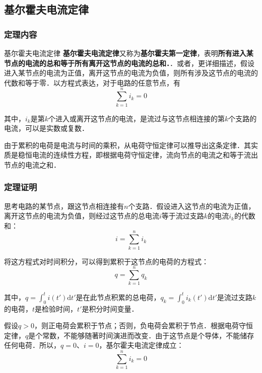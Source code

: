 
\subsection{基尔霍夫电流定律}

\subsubsection{定理内容}
\begin{theorem}{基尔霍夫电流定律}
\textbf{基尔霍夫电流定律}又称为\textbf{基尔霍夫第一定律}，表明\textbf{所有进入某节点的电流的总和等于所有离开这节点的电流的总和．}．或者，更详细描述，假设进入某节点的电流为正值，离开这节点的电流为负值，则所有涉及这节点的电流的代数和等于零．以方程式表达，对于电路的任意节点，有
\begin{equation}
\sum_{k=1}^n i_k =0
\end{equation}

其中，$i_k$是第$k$个进入或离开这节点的电流，是流过与这节点相连接的第$k$个支路的电流，可以是实数或复数．
\end{theorem}


由于累积的电荷是电流与时间的乘积，从电荷守恒定律可以推导出这条定律．其实质是稳恒电流的连续性方程，即根据电荷守恒定律，流向节点的电流之和等于流出节点的电流之和．

\subsubsection{定理证明}
思考电路的某节点，跟这节点相连接有$n$个支路．假设进入这节点的电流为正值，离开这节点的电流为负值，则经过这节点的总电流$i$等于流过支路$k$的电流$i_k$的代数和：
\begin{equation}
i=\sum_{k=1}^n i_k
\end{equation}

将这方程式对时间积分，可以得到累积于这节点的电荷的方程式：
\begin{equation}
q=\sum_{k=1}^n q_k
\end{equation}

其中，$\displaystyle q=\int_0^t i(t') \mathrm{d}t'$是在此节点积累的总电荷，$\displaystyle q_k=\int_0^t i_k(t') \mathrm{d}t'$是流过支路$k$的电荷，$t$是检验时间，$t'$是积分时间变量．

假设$q>0$，则正电荷会累积于节点；否则，负电荷会累积于节点．根据电荷守恒定律，$q$是个常数，不能够随著时间演进而改变．由于这节点是个导体，不能储存任何电荷．所以，$q=0$、$i=0$，基尔霍夫电流定律成立：
\begin{equation}
\sum_{k=1}^n i_k =0
\end{equation}

